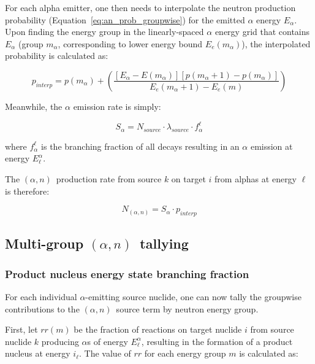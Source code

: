 \documentclass[10pt]{article}
\newcommand{\alphn}[0]{$\left(\alpha,n\right)$}
\begin{document}
For each alpha emitter, one then needs to interpolate the neutron production probability (Equation~\eqref{eq:an_prob_groupwise}) for the emitted $\alpha$ energy $E_\alpha$. Upon finding the energy group in the linearly-spaced $\alpha$ energy grid that contains $E_\alpha$ (group $m_\alpha$, corresponding to lower energy bound $E_e\left(m_\alpha\right)$), the interpolated probability is calculated as:

\begin{equation}
\boxed{ \displaystyle p_{interp} = p\left(m_\alpha\right) + \left( \frac{ \left[ E_\alpha - E\left(m_\alpha\right) \right] \left[ p\left(m_\alpha + 1\right) - p\left(m_\alpha \right) \right]}{E_e\left(m_\alpha+1 \right) - E_e\left(m\right) } \right) }
\label{eq:p_interp}
\end{equation}

Meanwhile, the $\alpha$ emission rate is simply: 

\begin{equation}
S_\alpha = N_{source} \cdot \lambda_{source} \cdot f_\alpha^\ell
\end{equation}

where $f_\alpha^\ell$ is the branching fraction of all decays resulting in an $\alpha$ emission at energy $E^\alpha_\ell$.

The \alphn\ production rate from source $k$ on target $i$ from alphas at energy $\ell$ is therefore:

\begin{equation}
N_{\left(\alpha,n\right)} = S_\alpha \cdot p_{interp}
\end{equation}

\subsection{Multi-group \alphn\ tallying}

\subsubsection{Product nucleus energy state branching fraction}

For each individual $\alpha$-emitting source nuclide, one can now tally the groupwise contributions to the \alphn\ source term by neutron energy group.

First, let $rr\left(m\right)$ be the fraction of reactions on target nuclide $i$ from source nuclide $k$ producing $\alpha$s of energy $E^\alpha_\ell$, resulting in the formation of a product nucleus at energy $i_\ell$. The value of $rr$ for each energy group $m$ is calculated as:
\end{document}
